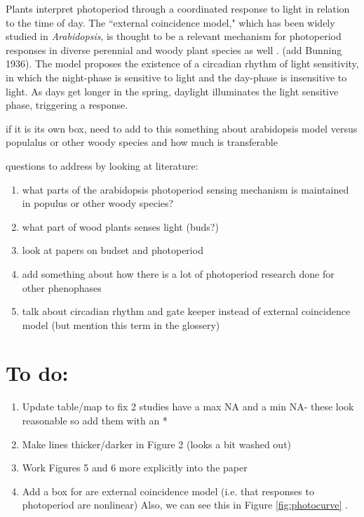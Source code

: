 \documentclass{article}
\begin{document}
\par Plants interpret photoperiod through a coordinated response to light in relation to the time of day. The ``external coincidence model," which has been widely studied in \emph{Arabidopsis}, is thought to be a relevant mechanism for photoperiod responses in diverse perennial and woody plant species as well \citep{davis2002,petterle2013,bastow2002,kobayashi2007,andres2012,Singh:2017}. (add Bunning 1936). The model proposes the existence of a circadian rhythm of light sensitivity, in which the night-phase is sensitive to light and the day-phase is insensitive to light. As days get longer in the spring, daylight illuminates the  light sensitive phase, triggering a response.%
\par if it is its own box, need to add to this something about arabidopsis model versus populalus or other woody species and how much is transferable
\par questions to address by looking at literature:
\begin{enumerate}
\item what parts of the arabidopsis photoperiod sensing mechanism is maintained in populus or other woody species?
\item what part of wood plants senses light (buds?)
\item look at papers on budset and photoperiod
\item  add something about how there is a lot of photoperiod research done for other phenophases
\item talk about circadian rhythm and gate keeper instead of external coincidence model (but mention this term in the glossery)
\end{enumerate}


\section* {To do:}
\begin{enumerate}
\item Update table/map to fix 2 studies have a max NA and a min NA- these look reasonable so add them with an *
\item Make lines thicker/darker in Figure 2 (looks a bit washed out)
\item Work Figures 5 and 6 more explicitly into the paper
\item Add a box for are external coincidence model (i.e. that responses to photoperiod are nonlinear) Also, we can see this in Figure \ref {fig:photocurve} .
\end{enumerate}
\end{document}

